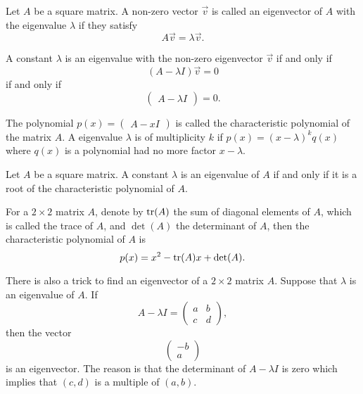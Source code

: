 Let $A$ be a square matrix. A non-zero vector $\vec{v}$ is called an eigenvector of $A$ with the eigenvalue $\lambda$ if they satisfy
\[A\vec{v} = \lambda \vec{v}.\]

A constant $\lambda$ is an eigenvalue with the non-zero eigenvector $\vec{v}$ if and only if 
\[
  (A - \lambda I) \vec{v}=0
\] 
if and only if
\[
\begin{pmatrix}
  A-\lambda I
\end{pmatrix}=0. 
\]

The polynomial $p(x)=\begin{pmatrix} A-xI \end{pmatrix}$ is called the characteristic polynomial of the matrix $A$. A eigenvalue $\lambda$ is of multiplicity $k$ if $p(x)=(x-\lambda)^kq(x)$ where $q(x)$ is a polynomial had no more factor $x-\lambda$. 

\begin{theorem}
Let $A$ be a square matrix. A constant $\lambda$ is an eigenvalue of $A$ if and only if it is a root of the characteristic polynomial of $A$.
\end{theorem}

For a $2\times 2$ matrix $A$, denote by $\operatorname{tr}(A)$ the sum of diagonal elements of $A$, which is called the trace of $A$, and $\det(A)$ the determinant of $A$, then the characteristic polynomial of $A$ is
\[p(x)=x^2-\operatorname{tr}(A)x+\det(A).\]

There is also a trick to find an eigenvector of a $2\times 2$ matrix $A$.
Suppose that $\lambda$ is an eigenvalue of $A$. If
\[
  A-\lambda I=
\begin{pmatrix}
  a & b\\
  c & d
\end{pmatrix},  
\]
then the vector 
\[\begin{pmatrix}
  -b \\ a
\end{pmatrix}\] 
is an eigenvector. The reason is that the determinant of $A-\lambda I$ is zero which implies that $(c, d)$ is a multiple of $(a, b)$. 


